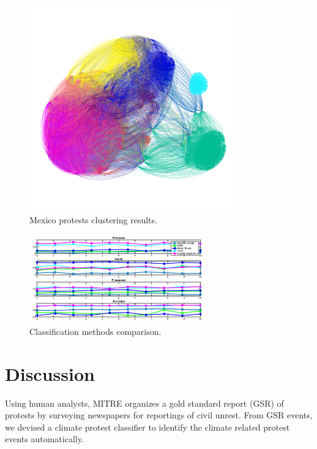 \documentclass[9pt,twocolumn,twoside]{pnas-new}
\begin{document}
\begin{figure}[ht]
\centerline
{\includegraphics[width = 3.5in]{figures/Mexico_cluster1}}
\caption{Mexico protests clustering results.}
\label{Mexico-cluster}
\end{figure}

\begin{figure}[ht]
\centerline
{\includegraphics[width = 3in, height=1.5in]{figures/resultsComp1}}
\caption{Classification methods comparison.}
\label{resultsComp}
\end{figure}

\section*{Discussion}


Using human analysts, MITRE organizes a gold standard report (GSR) of protests by surveying newspapers for reportings of civil unrest. From GSR events, we devised a climate protest classifier to identify the climate related protest events automatically.
\end{document}
